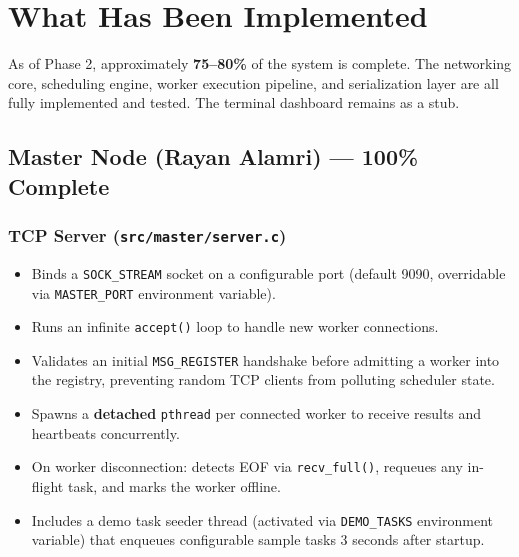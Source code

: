 \documentclass[12pt,a4paper]{article}
\begin{document}
\section{What Has Been Implemented}

As of Phase 2, approximately \textbf{75--80\%} of the system is complete.
The networking core, scheduling engine, worker execution pipeline, and serialization
layer are all fully implemented and tested. The terminal dashboard remains as a stub.

\subsection{Master Node (Rayan Alamri) --- 100\% Complete}

\subsubsection{TCP Server (\texttt{src/master/server.c})}
\begin{itemize}[noitemsep]
    \item Binds a \texttt{SOCK\_STREAM} socket on a configurable port (default 9090, overridable via \texttt{MASTER\_PORT} environment variable).
    \item Runs an infinite \texttt{accept()} loop to handle new worker connections.
    \item Validates an initial \texttt{MSG\_REGISTER} handshake before admitting a worker into the registry, preventing random TCP clients from polluting scheduler state.
    \item Spawns a \textbf{detached} \texttt{pthread} per connected worker to receive results and heartbeats concurrently.
    \item On worker disconnection: detects EOF via \texttt{recv\_full()}, requeues any in-flight task, and marks the worker offline.
    \item Includes a demo task seeder thread (activated via \texttt{DEMO\_TASKS} environment variable) that enqueues configurable sample tasks 3 seconds after startup.
\end{itemize}
\end{document}

